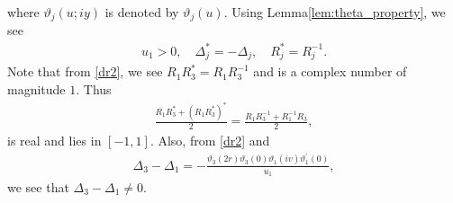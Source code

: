 \documentclass[10pt,leqno]{amsart}
\numberwithin{equation}{section}
\begin{document}
where $\vartheta_j(u;iy)$ is denoted by $\vartheta_j(u)$.
Using Lemma\ref{lem:theta_property}, we see
\begin{equation}\label{dr2}
\begin{split} 
u_{1}>0,\quad\Delta_{j}^{*}=-\Delta_{j}, \quad R_{j}^{*}=R_{j}^{-1}.
\end{split}
\end{equation}
Note that from \eqref{dr2}, we see $R_{1}R_{3}^{*}=R_{1}R_{3}^{-1}$ and is a complex number of magnitude $1$. Thus
\begin{equation}\label{dr3}
\begin{split}
\frac{R_{1}R_{3}^{*}+(R_{1}R_{3}^{*})^{*}}{2}=\frac{R_{1}R_{3}^{-1}+R_{1}^{-1}R_{3}}{2},
\end{split}
\end{equation}
is real and lies in $[-1,1]$.
Also, from \eqref{dr2} and
\begin{align}\label{Delta_3andDelta_1}
\Delta_{3}-\Delta_{1}=-\frac{\vartheta_3\left(2r\right)\vartheta_3\left(0\right)\vartheta_1\left(iv\right)\vartheta_1^{'}\left(0\right)}{u_{1}},
\end{align}
we see that $\Delta_{3}-\Delta_{1}\neq 0$.
\end{document}
